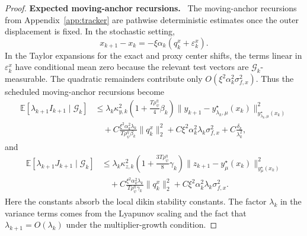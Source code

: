 \documentclass{article}
\newcommand{\proofstep}[1]{\par\smallskip\noindent\textbf{#1}\ }
\begin{document}
\begin{proof}
\proofstep{Expected moving-anchor recursions.}
The moving-anchor recursions from Appendix~\ref{app:tracker} are pathwise deterministic estimates
once the outer displacement is fixed. In the stochastic setting,
\[
x_{k+1}-x_k
=
-\xi\alpha_k(q_k^x+\varepsilon_k^x).
\]
In the Taylor expansions for the exact and proxy center shifts, the terms linear in
\(\varepsilon_k^x\) have conditional mean zero because the relevant test vectors are
\(\mathcal G_k\)-measurable. The quadratic remainders contribute only
\(O(\xi^2\alpha_k^2\sigma_{f,x}^2)\). Thus the scheduled moving-anchor recursions become
\begin{align}
\mathbb E[\lambda_{k+1}I_{k+1}\mid \mathcal G_k]
&\le
\lambda_k\kappa_{y,k}^2
\left(1+\frac{T\rho_\psi^\eta}{4}\beta_k\right)
\|y_{k+1}-y_{\lambda_k,\mu}^\star(x_k)\|_{y_{\lambda_k,\mu}^\star(x_k)}^2
\nonumber\\
&\quad
+
C\frac{\xi^2\alpha_k^2\lambda_k}{T\rho_\psi^\eta\beta_k}\|q_k^x\|_2^2
+
C\xi^2\alpha_k^2\lambda_k\sigma_{f,x}^2
+
C\frac{\delta_k}{\lambda_k^2},
\label{eq:stoch_proxy_moving_recursion}
\end{align}
and
\begin{align}
\mathbb E[\lambda_{k+1}J_{k+1}\mid \mathcal G_k]
&\le
\lambda_k\kappa_{z,k}^2
\left(1+\frac{3T\rho_\psi^\eta}{8}\gamma_k\right)
\|z_{k+1}-y_\mu^\star(x_k)\|_{y_\mu^\star(x_k)}^2
\nonumber\\
&\quad
+
C\frac{\xi^2\alpha_k^2\lambda_k}{T\rho_\psi^\eta\gamma_k}\|q_k^x\|_2^2
+
C\xi^2\alpha_k^2\lambda_k\sigma_{f,x}^2 .
\label{eq:stoch_exact_moving_recursion}
\end{align}
Here the constants absorb the local dikin stability constants. The factor \(\lambda_k\) in the
variance terms comes from the Lyapunov scaling and the fact that
\(\lambda_{k+1}=O(\lambda_k)\) under the multiplier-growth condition.


\end{proof}
\end{document}
